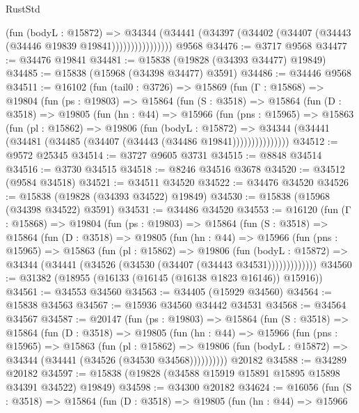 \begin{lexlean}{RustStd}
\begin{coremodule}
                      (fun (bodyL : @15872) =>
                      @34344
                        (@34441
                          (@34397 (@34402 (@34407 (@34443 (@34446 @19839 @19841))))))))))))))))
    @9568
@34476 := @3717 @9568
@34477 := @34476 @19841
@34481 := @15838 (@19828 (@34393 @34477) @19849)
@34485 := @15838 (@15968 (@34398 @34477) @3591)
@34486 := @34446 @9568
@34511 := @16102
    (fun (tail0 : @3726) =>
    @15869
      (fun (Γ : @15868) =>
      @19804
        (fun (ps : @19803) =>
        @15864
          (fun (S : @3518) =>
          @15864
            (fun (D : @3518) =>
            @19805
              (fun (hn : @44) =>
              @15966
                (fun (pns : @15965) =>
                @15863
                  (fun (pl : @15862) =>
                  @19806
                    (fun (bodyL : @15872) =>
                    @34344 (@34441 (@34481 (@34485 (@34407 (@34443 (@34486 @19841)))))))))))))))
@34512 := @9572 @25345
@34514 := @3727 @9605 @3731
@34515 := @8848 @34514
@34516 := @3730 @34515
@34518 := @8246 @34516 @3678
@34520 := @34512 (@9584 @34518)
@34521 := @34511 @34520
@34522 := @34476 @34520
@34526 := @15838 (@19828 (@34393 @34522) @19849)
@34530 := @15838 (@15968 (@34398 @34522) @3591)
@34531 := @34486 @34520
@34553 := @16120
    (fun (Γ : @15868) =>
    @19804
      (fun (ps : @19803) =>
      @15864
        (fun (S : @3518) =>
        @15864
          (fun (D : @3518) =>
          @19805
            (fun (hn : @44) =>
            @15966
              (fun (pns : @15965) =>
              @15863
                (fun (pl : @15862) =>
                @19806
                  (fun (bodyL : @15872) =>
                  @34344 (@34441 (@34526 (@34530 (@34407 (@34443 @34531)))))))))))))
@34560 := @31382 (@18955 (@16133 (@16145 (@16138 @1823 @16146)) @15916))
@34561 := @34553 @34560
@34563 := @34405 (@15929 @34560)
@34564 := @15838 @34563
@34567 := @15936 @34560 @34442 @34531
@34568 := @34564 @34567
@34587 := @20147
    (fun (ps : @19803) =>
    @15864
      (fun (S : @3518) =>
      @15864
        (fun (D : @3518) =>
        @19805
          (fun (hn : @44) =>
          @15966
            (fun (pns : @15965) =>
            @15863
              (fun (pl : @15862) =>
              @19806 (fun (bodyL : @15872) => @34344 (@34441 (@34526 (@34530 @34568))))))))))
    @20182
@34588 := @34289 @20182
@34597 := @15838 (@19828 (@34588 @15919 @15891 @15895 @15898 @34391 @34522) @19849)
@34598 := @34300 @20182
@34624 := @16056
    (fun (S : @3518) =>
    @15864
      (fun (D : @3518) =>
      @19805
        (fun (hn : @44) =>
        @15966

\end{coremodule}
\end{lexlean}
